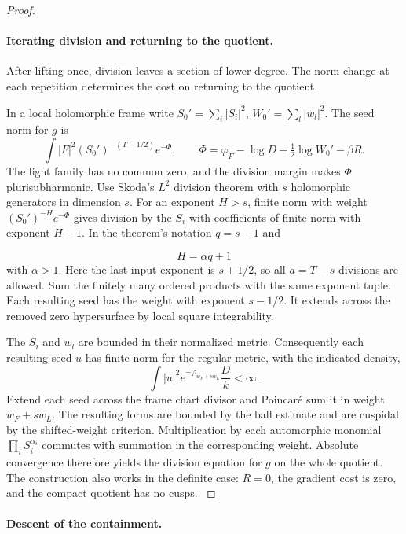 \begin{proof}
\paragraph{Iterating division and returning to the quotient.}

After lifting once, division leaves a section of lower degree. The norm change at each repetition determines the cost on returning to the quotient.

In a local holomorphic frame write
\(S_0'=\sum_i|S_i|^2\), \(W_0'=\sum_l|w_l|^2\).
The seed norm for \(g\) is
\[
  \int |F|^2 (S_0')^{-(T-1/2)} e^{-\Phi},\qquad
     \Phi=\varphi_F-\log D+\tfrac12\log W_0'-\beta R .
\]
The light family has no common zero, and the division
margin makes \(\Phi\) plurisubharmonic. Use Skoda's
\(L^2\) division theorem with \(s\) holomorphic
generators in dimension \(s\). For an exponent
\(H>s\), finite norm with weight
\((S_0')^{-H}e^{-\Phi}\) gives division by the \(S_i\)
with coefficients of finite norm with exponent \(H-1\).
In the theorem's notation \(q=s-1\) and

\[
  H=\alpha q+1
\]
 with \(\alpha>1\).
Here the last input exponent is \(s+1/2\), so all
\(a=T-s\) divisions are allowed. Sum the finitely
many ordered products with the same exponent tuple.
Each resulting seed has the weight with exponent
\(s-1/2\). It extends across the removed zero
hypersurface by local square integrability.

The \(S_i\) and \(w_l\) are bounded in their normalized metric. Consequently each resulting seed \(u\) has finite norm for the regular metric, with the indicated density,
\[
  \int|u|^2 e^{-\varphi_{w_F+s w_L}}\frac{D}{k}<\infty.
\]
Extend each seed across the frame chart divisor
and Poincar\'e sum it in weight \(w_F+s w_L\).
The resulting forms are bounded by the ball estimate
and are cuspidal by the shifted-weight criterion.
Multiplication by each automorphic monomial
\(\prod_i S_i^{\alpha_i}\) commutes with summation
in the corresponding weight. Absolute convergence
therefore yields the division equation for \(g\)
on the whole quotient. The construction also works
in the definite case: \(R=0\), the gradient cost
is zero, and the compact quotient has no cusps.
\cite{skoda-slice}\label{cor:slice-short-division-2}

\end{proof}



\paragraph{Descent of the containment.}

